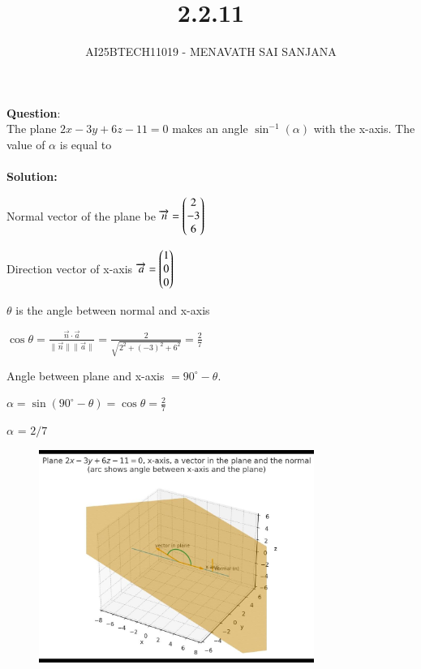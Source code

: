 \documentclass[journal]{IEEEtran}
\begin{document}

\vspace{3cm}

\title{2.2.11}
\author{AI25BTECH11019 - MENAVATH SAI SANJANA}
{\let\newpage\relax\maketitle}

\renewcommand{\thefigure}{\theenumi}
\renewcommand{\thetable}{\theenumi}
\setlength{\intextsep}{10pt} %


\renewcommand{\thetable}{\theenumi}

\textbf{Question}:\\
The plane $2x - 3y + 6z - 11 = 0$ makes an angle $\sin^{-1}(\alpha)$ with the x-axis. The value of $\alpha$ is equal to  \\
\\
\bigskip
\textbf{Solution: }

Normal vector of the plane be 
$
\overrightarrow{n} = \begin{pmatrix}2 \\ -3 \\ 6\end{pmatrix}
$

Direction vector of x-axis 
$
\overrightarrow{a} = \begin{pmatrix}1 \\ 0 \\ 0\end{pmatrix}
$

$\theta$ is the angle between normal and x-axis
\\
\bigskip

$
\cos \theta = \frac{\overrightarrow{n} \cdot \overrightarrow{a}}{\lVert \overrightarrow{n}\rVert \lVert \overrightarrow{a}\rVert}
= \frac{2}{\sqrt{2^2 + (-3)^2 + 6^2}}
= \frac{2}{7}
$
\\
\bigskip

Angle between plane and x-axis $= 90^\circ - \theta$.

$
\alpha = \sin(90^\circ - \theta) = \cos\theta = \frac{2}{7}
$

$\alpha$ = $2/7$

\begin{figure}[ht!]
    \centering
    \includegraphics[width=0.8\textwidth]{figs/matgeo-2.2.11.jpeg}
    \caption{}
    \label{fig:1.2.27.jpg}
\end{figure}
\end{document}
